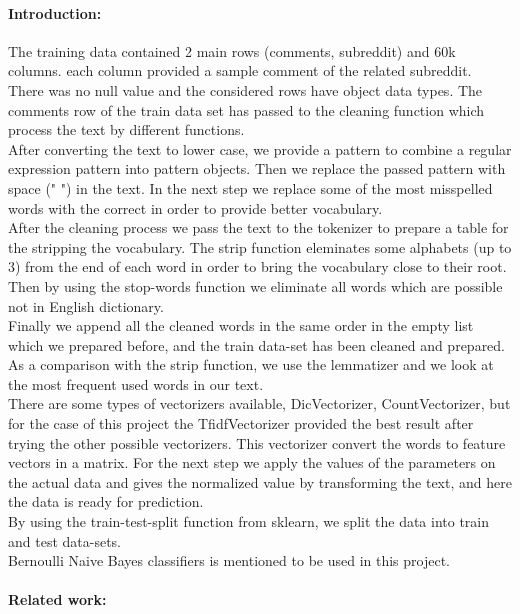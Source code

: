 \documentclass[12pt]{report}
\begin{document}
	\paragraph{Introduction:}
	The training data contained 2 main rows (comments, subreddit) and 60k columns. each column provided a sample comment of the related subreddit.\\
	There was no null value and the considered rows have object data types.
	The comments row of the train data set has passed to the cleaning function which process the text by different functions.\\
	After converting the text to lower case, we provide a pattern to combine a regular expression pattern into pattern objects. Then we replace the passed pattern with space (" ") in the text.
	In the next step we replace some of the most misspelled words with the correct in order to provide better vocabulary.\\
	After the cleaning process we pass the text to the tokenizer to prepare a table for the stripping the vocabulary. The strip function eleminates some alphabets (up to 3) from the end of each word in order to bring the vocabulary close to their root.  
	Then by using the stop-words function we eliminate all words which are possible not in English dictionary. \\
	Finally we append all the cleaned words in the same order in the empty list which we prepared before, and the train data-set has been cleaned and prepared. \\
	As a comparison with the strip function, we use the lemmatizer and we look at the most frequent used words in our text.\\
	There are some types of vectorizers available, DicVectorizer, CountVectorizer, but for the case of this project the TfidfVectorizer provided the best result after trying the other possible vectorizers.
	This vectorizer convert the words to feature vectors in a matrix.
	For the next step we apply the values of the parameters on the actual data and gives the normalized value by transforming the text, and here the data is ready for prediction. \\
	By using the train-test-split function from sklearn, we split the data into train and test data-sets.\\
	Bernoulli Naive Bayes classifiers is mentioned to be used in this project.
	 
	  
	
	
	\paragraph{Related work:}
	
\end{document}
